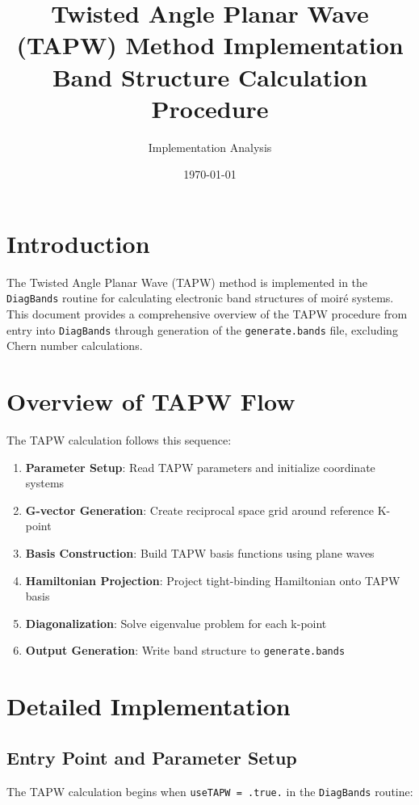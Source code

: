 \documentclass[11pt,a4paper]{article}
\title{Twisted Angle Planar Wave (TAPW) Method Implementation\\
Band Structure Calculation Procedure}
\author{Implementation Analysis}
\date{\today}
\begin{document}
\maketitle

\section{Introduction}

The Twisted Angle Planar Wave (TAPW) method is implemented in the \texttt{DiagBands} routine for calculating electronic band structures of moiré systems. This document provides a comprehensive overview of the TAPW procedure from entry into \texttt{DiagBands} through generation of the \texttt{generate.bands} file, excluding Chern number calculations.

\section{Overview of TAPW Flow}

The TAPW calculation follows this sequence:
\begin{enumerate}
    \item \textbf{Parameter Setup}: Read TAPW parameters and initialize coordinate systems
    \item \textbf{G-vector Generation}: Create reciprocal space grid around reference K-point
    \item \textbf{Basis Construction}: Build TAPW basis functions using plane waves
    \item \textbf{Hamiltonian Projection}: Project tight-binding Hamiltonian onto TAPW basis
    \item \textbf{Diagonalization}: Solve eigenvalue problem for each k-point
    \item \textbf{Output Generation}: Write band structure to \texttt{generate.bands}
\end{enumerate}

\section{Detailed Implementation}

\subsection{Entry Point and Parameter Setup}

The TAPW calculation begins when \texttt{useTAPW = .true.} in the \texttt{DiagBands} routine:
\end{document}
